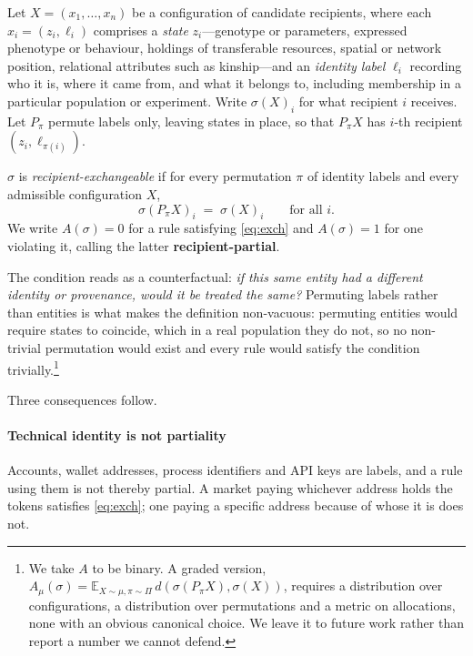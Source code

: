 \documentclass[review,3p,times]{elsarticle}
\begin{document}
Let $X=(x_1,\dots,x_n)$ be a configuration of candidate recipients, where
each $x_i=(z_i,\ell_i)$ comprises a \emph{state} $z_i$---genotype or
parameters, expressed phenotype or behaviour, holdings of transferable
resources, spatial or network position, relational attributes such as
kinship---and an \emph{identity label} $\ell_i$ recording who it is, where
it came from, and what it belongs to, including membership in a particular
population or experiment. Write $\sigma(X)_i$ for what recipient $i$
receives. Let $P_\pi$ permute labels only, leaving states in place, so that
$P_\pi X$ has $i$-th recipient $(z_i,\ell_{\pi(i)})$.

\begin{definition}
$\sigma$ is \emph{recipient-exchangeable} if for every permutation $\pi$ of
identity labels and every admissible configuration $X$,
\begin{equation}
\sigma(P_\pi X)_i \;=\; \sigma(X)_i \qquad \text{for all } i .
\label{eq:exch}
\end{equation}
We write $A(\sigma)=0$ for a rule satisfying \eqref{eq:exch} and
$A(\sigma)=1$ for one violating it, calling the latter
\textbf{recipient-partial}.
\end{definition}

The condition reads as a counterfactual: \emph{if this same entity had a
different identity or provenance, would it be treated the same?} Permuting
labels rather than entities is what makes the definition non-vacuous:
permuting entities would require states to coincide, which in a real
population they do not, so no non-trivial permutation would exist and every
rule would satisfy the condition trivially.\footnote{We take $A$ to be
binary. A graded version,
$A_\mu(\sigma)=\mathbb{E}_{X\sim\mu,\pi\sim\Pi}\,d\!\left(\sigma(P_\pi X),\sigma(X)\right)$,
requires a distribution over configurations, a distribution over
permutations and a metric on allocations, none with an obvious canonical
choice. We leave it to future work rather than report a number we cannot
defend.}

Three consequences follow.

\paragraph{Technical identity is not partiality}
Accounts, wallet addresses, process identifiers and API keys are labels, and a
rule using them is not thereby partial. A market paying whichever address holds
the tokens satisfies \eqref{eq:exch}; one paying a specific address because of
whose it is does not.
\end{document}
